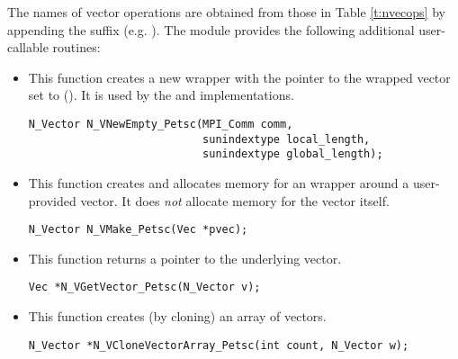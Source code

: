 The names of vector operations are obtained from those in 
Table \ref{t:nvecops} by appending the suffix  (e.g. ).
The module {\nvecpetsc}  provides the following additional user-callable routines:
\begin{itemize}

  

\item {}
 
  This function creates a new {\nvector} wrapper with the pointer to
  the wrapped {\petsc} vector set to (). It is used by the 
   and  implementations. 

\begin{verbatim}
N_Vector N_VNewEmpty_Petsc(MPI_Comm comm, 
                           sunindextype local_length, 
                           sunindextype global_length);
\end{verbatim}

  

\item {}
  
  This function creates and allocates memory for an {\nvecpetsc}
  wrapper around a user-provided {\petsc} vector. It does {\em not} 
  allocate memory for the vector  itself.

\begin{verbatim}
N_Vector N_VMake_Petsc(Vec *pvec);
\end{verbatim}


\item {}
  
  This function returns a pointer to the underlying {\petsc} vector.

\begin{verbatim}
Vec *N_VGetVector_Petsc(N_Vector v);
\end{verbatim}



\item {}
 
  This function creates (by cloning) an array of  {\nvecpetsc} vectors.
 
\begin{verbatim}
N_Vector *N_VCloneVectorArray_Petsc(int count, N_Vector w);
\end{verbatim}


\end{itemize}
